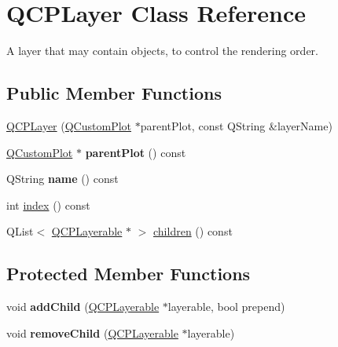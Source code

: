 \hypertarget{classQCPLayer}{\section{Q\-C\-P\-Layer Class Reference}
\label{classQCPLayer}
}


A layer that may contain objects, to control the rendering order.  


\subsection*{Public Member Functions}
\begin{DoxyCompactItemize}
\item 
\hyperlink{classQCPLayer_a5d0657fc86d624e5efbe930ef21af718}{Q\-C\-P\-Layer} (\hyperlink{classQCustomPlot}{Q\-Custom\-Plot} $\ast$parent\-Plot, const Q\-String \&layer\-Name)
\item 
\hypertarget{classQCPLayer_a3958c9a938c2d05a7378c41484acee08}{\hyperlink{classQCustomPlot}{Q\-Custom\-Plot} $\ast$ {\bfseries parent\-Plot} () const }\label{classQCPLayer_a3958c9a938c2d05a7378c41484acee08}

\item 
\hypertarget{classQCPLayer_a96ebd1e436f3813938cb9cd4a59a60be}{Q\-String {\bfseries name} () const }\label{classQCPLayer_a96ebd1e436f3813938cb9cd4a59a60be}

\item 
int \hyperlink{classQCPLayer_ad5d7010829a6b99f326b07d7e37c8c99}{index} () const 
\item 
Q\-List$<$ \hyperlink{classQCPLayerable}{Q\-C\-P\-Layerable} $\ast$ $>$ \hyperlink{classQCPLayer_a94c2f0100e48cefad2de8fe0fbb03c27}{children} () const 
\end{DoxyCompactItemize}
\subsection*{Protected Member Functions}
\begin{DoxyCompactItemize}
\item 
\hypertarget{classQCPLayer_a57ce5e49364aa9122276d5df3b4a0ddc}{void {\bfseries add\-Child} (\hyperlink{classQCPLayerable}{Q\-C\-P\-Layerable} $\ast$layerable, bool prepend)}\label{classQCPLayer_a57ce5e49364aa9122276d5df3b4a0ddc}

\item 
\hypertarget{classQCPLayer_ac2f64ac7761650582d968d86670ef362}{void {\bfseries remove\-Child} (\hyperlink{classQCPLayerable}{Q\-C\-P\-Layerable} $\ast$layerable)}\label{classQCPLayer_ac2f64ac7761650582d968d86670ef362}

\end{DoxyCompactItemize}
